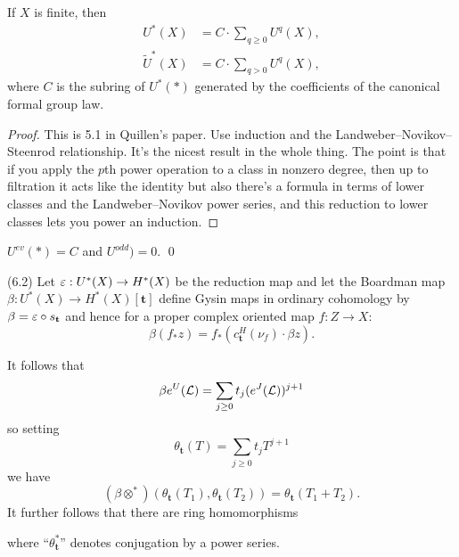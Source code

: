 \begin{theorem}
If $X$ is finite, then
\begin{align*}
U^*(X) & = C \cdot \sum_{q \ge 0} U^q(X), \\
\widetilde U^*(X) & = C \cdot \sum_{q > 0} U^q(X),
\end{align*}
where $C$ is the subring of $U^*(*)$ generated by the coefficients of the canonical formal group law.
\end{theorem}
\begin{proof}
This is 5.1 in Quillen's paper. Use induction and the Landweber--Novikov--Steenrod relationship.  It's the nicest result in the whole thing.  The point is that if you apply the $p$th power operation to a class in nonzero degree, then up to filtration it acts like the identity but also there's a formula in terms of lower classes and the Landweber--Novikov power series, and this reduction to lower classes lets you power an induction.
\end{proof}

\begin{corollary}
$U^{ev}(*) = C$ and $U^{odd}) = 0$. \qed
\end{corollary}

\begin{definition}(6.2)
Let $\varepsilon: U^*(X) \to H^*(X)$ be the reduction map and let the Boardman map $\beta: U^*(X) \to H^*(X)[\mathbf t]$ define Gysin maps in ordinary cohomology by $\beta = \varepsilon \circ s_{\mathbf t}$ and hence for a proper complex oriented map $f: Z \to X$: \[\beta(f_* z) = f_*(c_{\mathbf t}^H(\nu_f) \cdot \beta z).\] 
\end{definition}

\begin{definition}
It follows that \[\beta e^U(\mathcal{L}) = \sum_{j \ge 0} t_j(e^J(\mathcal{L}))^{j+1}\] so setting \[\theta_{\mathbf t}(T) = \sum_{j \ge 0} t_j T^{j+1}\] we have \[(\beta \otimes^*)(\theta_{\mathbf t}(T_1), \theta_{\mathbf t}(T_2)) = \theta_{\mathbf t}(T_1 + T_2).\]  It further follows that there are ring homomorphisms
\begin{center}
\end{center}
where ``$\theta_{\mathbf t}^*$'' denotes conjugation by a power series.
\end{definition}

